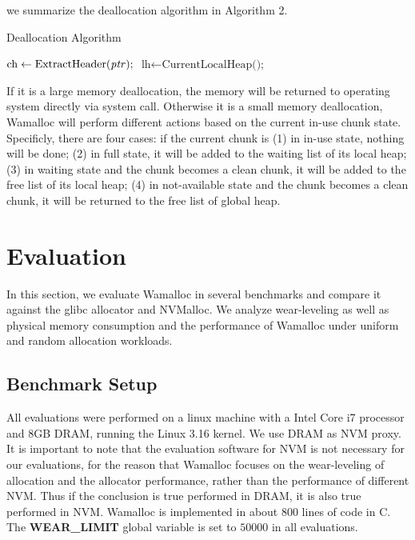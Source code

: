 \documentclass[10pt, conference, compsocconf]{IEEEtran}
\begin{document}
we summarize the deallocation algorithm in Algorithm 2.

\begin{algorithm}
\caption{Deallocation Algorithm}\label{euclid}
\begin{algorithmic}[1]

\State $\text{ch} \gets \text{ExtractHeader(\textit{ptr});}$
\State $\text{lh} \gets \text{CurrentLocalHeap();}$

\State {}
\Else
\State {}
\EndIf

\EndProcedure
\end{algorithmic}
\end{algorithm}

If it is a large memory deallocation, the memory will be returned to operating system directly via system call.
Otherwise it is a small memory deallocation, Wamalloc will perform different actions based on the current in-use chunk state.
Specificly, there are four cases: if the current chunk is 
(1) in in-use state, nothing will be done;
(2) in full state, it will be added to the waiting list of its local heap;
(3) in waiting state and the chunk becomes a clean chunk, it will be added to the free list of its local heap;
(4) in not-available state and the chunk becomes a clean chunk, it will be returned to the free list of global heap.

\section{Evaluation}

In this section, we evaluate Wamalloc in several benchmarks and compare it against the glibc allocator and NVMalloc.
We analyze wear-leveling as well as physical memory consumption and the performance of Wamalloc under uniform and random allocation workloads.

\subsection{Benchmark Setup}

All evaluations were performed on a linux machine with a Intel Core i7 processor and 8GB DRAM, running the Linux 3.16 kernel.
We use DRAM as NVM proxy.
It is important to note that the evaluation software for NVM is not necessary for our evaluations, 
for the reason that Wamalloc focuses on the wear-leveling of allocation and the allocator performance, rather than the performance of different NVM.
Thus if the conclusion is true performed in DRAM, it is also true performed in NVM.
Wamalloc is implemented in about 800 lines of code in C.
The \textbf{WEAR\_LIMIT} global variable is set to $50000$ in all evaluations.
\end{document}
